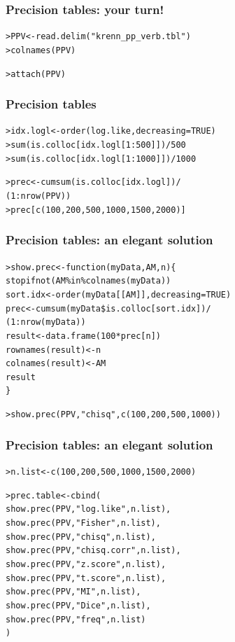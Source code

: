 \documentclass[handout,notes=show,t]{beamer} %
\begin{document}
\begin{frame}[fragile]
  \frametitle{Precision tables: your turn!}

  \begin{alltt}
> PPV <- read.delim("krenn_pp_verb.tbl")
> colnames(PPV)

> attach(PPV)

  \end{alltt}
\end{frame}

\begin{frame}[fragile]
  \frametitle{Precision tables}

  \begin{alltt}
> idx.logl <- order(log.like, decreasing=TRUE)
> sum(is.colloc[idx.logl[1:500]]) / 500   
> sum(is.colloc[idx.logl[1:1000]]) / 1000 

> prec <- cumsum(is.colloc[idx.logl]) / 
  (1:nrow(PPV))
> prec[c(100,200,500,1000,1500,2000)]    
  \end{alltt}
\end{frame}

\begin{frame}[fragile]
  \frametitle{Precision tables: an elegant solution}

  \begin{alltt}
> show.prec <- function(myData, AM, n) \{
  stopifnot(AM \%in\% colnames(myData)) 
  sort.idx <- order(myData[[AM]], decreasing=TRUE)
  prec <- cumsum(myData\$is.colloc[sort.idx]) / 
          (1:nrow(myData))
  result <- data.frame(100 * prec[n]) 
  rownames(result) <- n  
  colnames(result) <- AM
  result  
  \}

> show.prec(PPV, "chisq", c(100,200,500,1000))

  \end{alltt}
\end{frame}

\begin{frame}[fragile]
  \frametitle{Precision tables: an elegant solution}

  \begin{alltt}
> n.list <- c(100,200,500,1000,1500,2000)

> prec.table <- cbind(
    show.prec(PPV, "log.like", n.list),
    show.prec(PPV, "Fisher", n.list),
    show.prec(PPV, "chisq", n.list),
    show.prec(PPV, "chisq.corr", n.list),
    show.prec(PPV, "z.score", n.list),
    show.prec(PPV, "t.score", n.list),
    show.prec(PPV, "MI", n.list),
    show.prec(PPV, "Dice", n.list),
    show.prec(PPV, "freq", n.list)
  )
  \end{alltt}
\end{frame}
\end{document}
